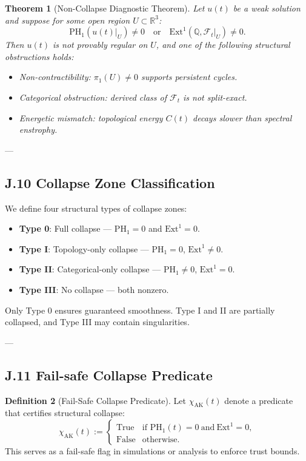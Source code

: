 \documentclass[11pt]{article}
\newtheorem{theorem}{Theorem}[section]
\theoremstyle{definition}
\newtheorem{definition}[theorem]{Definition}
\begin{document}
\begin{theorem}[Non-Collapse Diagnostic Theorem]
Let \( u(t) \) be a weak solution and suppose for some open region \( U \subset \mathbb{R}^3 \):
\[
\mathrm{PH}_1(u(t)|_U) \neq 0 \quad \text{or} \quad \mathrm{Ext}^1(\mathbb{Q}, \mathcal{F}_t|_U) \neq 0.
\]
Then \( u(t) \) is not provably regular on \( U \), and one of the following structural obstructions holds:
\begin{itemize}
  \item[(a)] Non-contractibility: \( \pi_1(U) \neq 0 \) supports persistent cycles.
  \item[(b)] Categorical obstruction: derived class of \( \mathcal{F}_t \) is not split-exact.
  \item[(c)] Energetic mismatch: topological energy $C(t)$ decays slower than spectral enstrophy.
\end{itemize}
\end{theorem}

---

\subsection*{J.10 Collapse Zone Classification}

We define four structural types of collapse zones:

\begin{itemize}
  \item \textbf{Type 0}: Full collapse — $\mathrm{PH}_1 = 0$ and $\mathrm{Ext}^1 = 0$.
  \item \textbf{Type I}: Topology-only collapse — $\mathrm{PH}_1 = 0$, $\mathrm{Ext}^1 \neq 0$.
  \item \textbf{Type II}: Categorical-only collapse — $\mathrm{PH}_1 \neq 0$, $\mathrm{Ext}^1 = 0$.
  \item \textbf{Type III}: No collapse — both nonzero.
\end{itemize}

Only Type 0 ensures guaranteed smoothness. Type I and II are partially collapsed, and Type III may contain singularities.

---

\subsection*{J.11 Fail-safe Collapse Predicate}

\begin{definition}[Fail-Safe Collapse Predicate]
Let $\chi_{\text{AK}}(t)$ denote a predicate that certifies structural collapse:
\[
\chi_{\text{AK}}(t) := 
\begin{cases}
\text{True} & \text{if } \mathrm{PH}_1(t) = 0 \ \text{and} \ \mathrm{Ext}^1 = 0, \\
\text{False} & \text{otherwise}.
\end{cases}
\]
This serves as a fail-safe flag in simulations or analysis to enforce trust bounds.
\end{definition}
\end{document}
